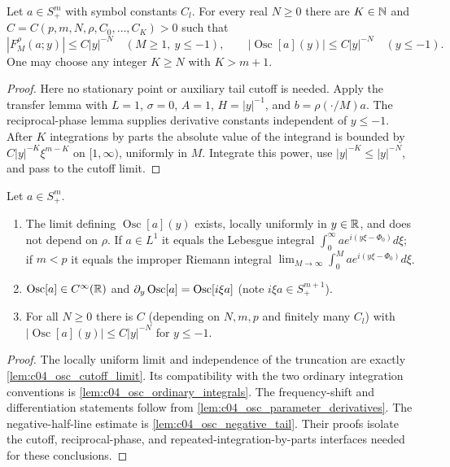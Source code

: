 \begin{lemma}
  \label{lem:c04_osc_negative_tail}
  Let $a\in S^m_+$ with symbol constants $C_l$. For every real $N\ge0$ there are
  $K\in\mathbb{N}$ and $C=C(p,m,N,\rho,C_0,\ldots,C_K)>0$ such that
  \[
    |F_M^\rho(a;y)|\le C|y|^{-N}\quad(M\ge1,\ y\le-1),\qquad
    |\operatorname{Osc}[a](y)|\le C|y|^{-N}\quad(y\le-1).
  \]
  One may choose any integer $K\ge N$ with $K>m+1$.
\end{lemma}
\begin{proof}
  Here no stationary point or auxiliary tail cutoff is needed. Apply the transfer lemma
  with $L=1$, $\sigma=0$, $A=1$, $H=|y|^{-1}$, and $b=\rho(\cdot/M)a$.
  The reciprocal-phase lemma supplies derivative constants independent of $y\le-1$.
  After $K$ integrations by parts the absolute value of the integrand is bounded by
  $C|y|^{-K}\xi^{m-K}$ on $[1,\infty)$, uniformly in $M$.
  Integrate this power, use $|y|^{-K}\le|y|^{-N}$, and pass to the cutoff limit.
\end{proof}

\begin{lemma}
  \label{lem:c04_osc_integral}
  Let $a\in S^m_+$.
  \begin{enumerate}
    \item The limit defining $\operatorname{Osc}[a](y)$ exists, locally uniformly in $y\in\mathbb{R}$, and does not depend on
      $\rho$. If $a\in L^1$ it equals the Lebesgue integral $\int_0^\infty ae^{i(y\xi-\Phi_0)}d\xi$; if $m<p$ it
      equals the improper Riemann integral $\lim_{M\to\infty}\int_0^M ae^{i(y\xi-\Phi_0)}d\xi$.
    \item $\operatorname{Osc}[a]\in C^\infty(\mathbb{R})$ and $\partial_y\operatorname{Osc}[a]=\operatorname{Osc}[i\xi a]$ (note
      $i\xi a\in S^{m+1}_+$).
    \item For all $N\ge0$ there is $C$ (depending on $N,m,p$ and finitely many $C_l$) with
      $|\operatorname{Osc}[a](y)|\le C|y|^{-N}$ for $y\le-1$.
  \end{enumerate}
\end{lemma}
\begin{proof}
  The locally uniform limit and independence of the truncation are exactly
  \cref{lem:c04_osc_cutoff_limit}. Its compatibility with the two ordinary integration
  conventions is \cref{lem:c04_osc_ordinary_integrals}.
  The frequency-shift and differentiation statements follow from
  \cref{lem:c04_osc_parameter_derivatives}. The negative-half-line estimate is
  \cref{lem:c04_osc_negative_tail}. Their proofs isolate the cutoff, reciprocal-phase,
  and repeated-integration-by-parts interfaces needed for these conclusions.
\end{proof}

